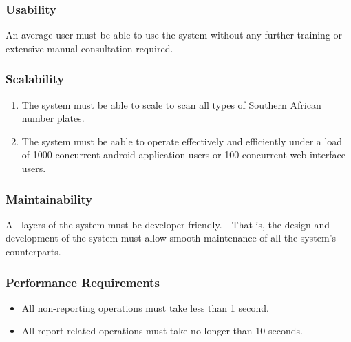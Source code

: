 \documentclass[12pt]{article}
\begin{document}
	                  	\vspace{0.1in}
	                  	\subsubsection{Usability}
	                  	An average user must be able to use the system without any further training or extensive manual consultation required.
	                  	
	                  	\vspace{0.1in}
	                  	\subsubsection{Scalability}
	                  	\begin{enumerate}
		                  	\item The system must be able to scale to scan all types of Southern African number plates.
		                  	\item The system must be aable to operate effectively and efficiently under a load of 1000 concurrent android application users or 100 concurrent web interface users.
	                  	\end{enumerate}
	                  	
	                  	\vspace{0.1in}
	                  	\subsubsection{Maintainability}
	                  	All layers of the system must be developer-friendly. - That is, the design and development of the system must allow smooth maintenance of all the system's counterparts.
	                  	
	                  	\vspace{0.1in}
	                  	\subsubsection{Performance Requirements}
	                  	\begin{itemize}
	                  		\item All non-reporting operations must take less than 1 second.
	                  		\item All report-related operations must take no longer than 10 seconds.
	                  	\end{itemize}
	                  	
\end{document}

